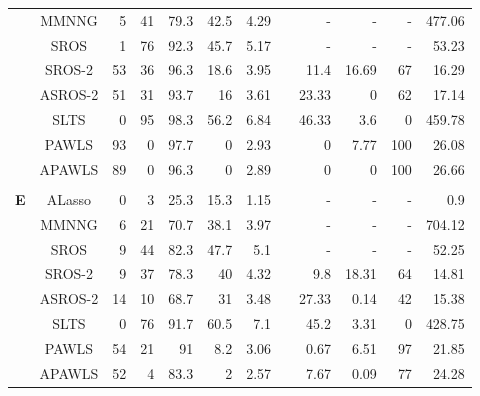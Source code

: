 \documentclass{article}\usepackage[]{graphicx}\usepackage[]{color}
\begin{document}
\begin{table}[thp]
\begin{center}
\begin{tabular}{ccrrrrrrrrrr}
	      & MMNNG & 5 & 41 & 79.3 
	      & 42.5 & 4.29 & & -& - & - & 477.06\\
	      
	      & SROS & 1 & 76 & 92.3 
	      & 45.7 & 5.17 & & -& - & - &  53.23\\
	      
	       & SROS-2 & 53 & 36 & 96.3 
	      & 18.6 & 3.95 & & 11.4 
	      & 16.69 & 67 & 16.29\\
	      
	      & ASROS-2 & 51 & 31 & 93.7 
	      & 16 & 3.61 & & 23.33 
	      & 0 & 62 & 17.14\\
	      
	      
	       & SLTS & 0 & 95 & 98.3 
	      & 56.2 & 6.84 & & 46.33 
	      & 3.6 & 0 & 459.78\\
	      
	      & PAWLS & 93 & 0 & 97.7 
	      & 0 & 2.93 & & 0 
	      & 7.77 & 100 & 26.08\\
	      
	      & APAWLS & 89 & 0 & 96.3 
	      & 0 & 2.89 & & 0 
	      & 0 & 100 & 26.66\\
	      
	      \\
	       	  \multirow{8}{*}{{\bf E}}
	      & ALasso & 0 & 3 & 25.3 
	      & 15.3 & 1.15 & & -& - & - &  0.9\\
	      
	      & MMNNG & 6 & 21 & 70.7 
	      & 38.1 & 3.97 & & -& - & - & 704.12\\
	      
	      & SROS & 9 & 44 & 82.3 
	      & 47.7 & 5.1 & & -& - & - &  52.25\\
	      
	       & SROS-2 & 9 & 37 & 78.3 
	      & 40 & 4.32 & & 9.8 
	      & 18.31 & 64 & 14.81\\
	      
	      & ASROS-2 & 14 & 10 & 68.7 
	      & 31 & 3.48 & & 27.33 
	      & 0.14 & 42 & 15.38\\
	      
	      
	       & SLTS & 0 & 76 & 91.7 
	      & 60.5 & 7.1 & & 45.2 
	      & 3.31 & 0 & 428.75\\
	      
	      & PAWLS & 54 & 21 & 91 
	      & 8.2 & 3.06 & & 0.67 
	      & 6.51 & 97 & 21.85\\
	      
	      & APAWLS & 52 & 4 & 83.3 
	      & 2 & 2.57 & & 7.67 
	      & 0.09 & 77 & 24.28\\
	   \hline\hline
	
	\end{tabular}
	\end{center}
	\end{table}
	
\end{document}
